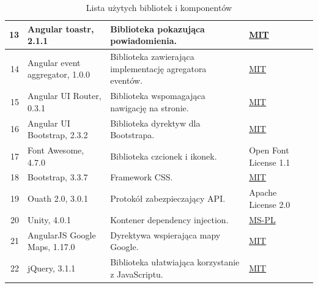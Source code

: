 \documentclass[10pt,a4paper]{article}
\begin{document}
\begin{table}[H]
	\begin{tabularx}{\textwidth}{|r|l|X|l|c|}
		\hline
		13 &
		Angular toastr, 2.1.1 &
		Biblioteka pokazująca powiadomienia. &
		\mbox{\hyperref[abbr:mit]{MIT}} &
		\cite{toastr} \\
		\hline
		14 &
		Angular event aggregator, 1.0.0 &
		Biblioteka zawierająca implementację agregatora eventów. &
		\mbox{\hyperref[abbr:mit]{MIT}} &
		\cite{angularevent} \\
		\hline
		15 &
		Angular UI Router, 0.3.1 &
		Biblioteka wspomagająca nawigację na stronie. &
		\mbox{\hyperref[abbr:mit]{MIT}} &
		\cite{uirouter} \\
		\hline
		16 &
		Angular UI Bootstrap, 2.3.2 &
		Biblioteka dyrektyw dla Bootstrapa. &
		\mbox{\hyperref[abbr:mit]{MIT}} &
		\cite{uibootstrap} \\
		\hline
		17 &
		Font Awesome, 4.7.0 &
		Biblioteka czcionek i ikonek. &
		Open Font License 1.1 &
		\cite{fontawesome} \\
		\hline
		18 &
		Bootstrap, 3.3.7 &
		Framework CSS. &
		\mbox{\hyperref[abbr:mit]{MIT}} &
		\cite{bootstrap} \\
		\hline
		19 &
		Ouath 2.0, 3.0.1 &
		Protokół zabezpieczający API. &
		Apache License 2.0 &
		\cite{oauth} \\
		\hline
		20 &
		Unity, 4.0.1 &
		Kontener dependency injection. &
		\mbox{\hyperref[abbr:mspl]{MS-PL}} &
		\cite{unity} \\
		\hline
		21 &
		AngularJS Google Maps, 1.17.0 &
		Dyrektywa wspierająca mapy Google. &
		\mbox{\hyperref[abbr:mit]{MIT}} &
		\cite{ngmap} \\
		\hline
		22 &
		jQuery, 3.1.1 &
		Biblioteka ułatwiająca korzystanie z JavaScriptu. &
		\mbox{\hyperref[abbr:mit]{MIT}} &
		\cite{jquery} \\
		\hline
	\end{tabularx}
	\caption{Lista użytych bibliotek i komponentów}
\end{table}
\end{document}
